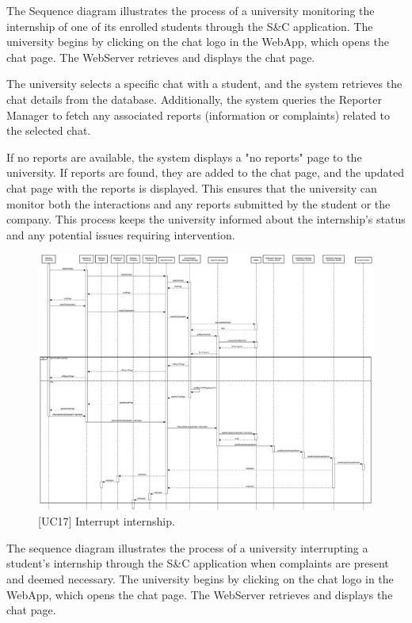 The Sequence diagram illustrates the process of a university monitoring the internship of one of its enrolled students through the S\&C application. The university begins by clicking on the chat logo in the WebApp, which opens the chat page. The WebServer retrieves and displays the chat page.

The university selects a specific chat with a student, and the system retrieves the chat details from the database. Additionally, the system queries the Reporter Manager to fetch any associated reports (information or complaints) related to the selected chat.

If no reports are available, the system displays a "no reports" page to the university. If reports are found, they are added to the chat page, and the updated chat page with the reports is displayed. This ensures that the university can monitor both the interactions and any reports submitted by the student or the company. This process keeps the university informed about the internship's status and any potential issues requiring intervention.

\newpage

\begin{figure}[htbp]
    \centering
    \includegraphics[width=\linewidth]{DD/Images/sequenceDiagrams/interruptInternship.png}
    \caption{[UC17] Interrupt internship.}
    \label{fig:interruptInternship_immagine}
\end{figure}



The sequence diagram illustrates the process of a university interrupting a student's internship through the S\&C application when complaints are present and deemed necessary. The university begins by clicking on the chat logo in the WebApp, which opens the chat page. The WebServer retrieves and displays the chat page.

